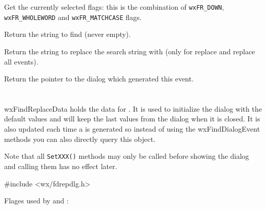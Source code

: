 \label{wxfinddialogeventgetflags}


Get the currently selected flags: this is the combination of {\tt wxFR\_DOWN},
{\tt wxFR\_WHOLEWORD} and {\tt wxFR\_MATCHCASE} flags.

\label{wxfinddialogeventgetfindstring}


Return the string to find (never empty).

\label{wxfinddialogeventgetreplacestring}


Return the string to replace the search string with (only for replace and
replace all events).

\label{wxfinddialogeventgetdialog}


Return the pointer to the dialog which generated this event.

\section{}\label{wxfindreplacedata}

wxFindReplaceData holds the data for 
. It is used to initialize
the dialog with the default values and will keep the last values from the
dialog when it is closed. It is also updated each time a 
 is generated so instead of
using the wxFindDialogEvent methods you can also directly query this object.

Note that all {\tt SetXXX()} methods may only be called before showing the
dialog and calling them has no effect later.


#include <wx/fdrepdlg.h>




Flages used by 
 and
:

